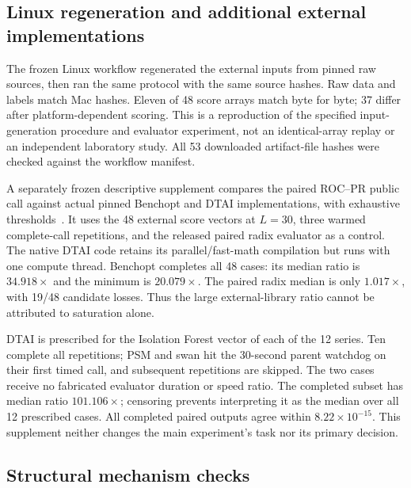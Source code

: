 \subsection{Linux regeneration and additional external implementations}
The frozen Linux workflow regenerated the external inputs from pinned raw
sources, then ran the same protocol with the same source hashes. Raw data
and labels match Mac hashes. Eleven of 48 score arrays match byte for byte;
37 differ after platform-dependent scoring. This is a reproduction of the
specified input-generation procedure and evaluator experiment, not an
identical-array replay or an independent laboratory study. All 53 downloaded
artifact-file hashes were checked against the workflow manifest.

A separately frozen descriptive supplement compares the paired ROC--PR
public call against actual pinned Benchopt and DTAI implementations, with
exhaustive thresholds~\cite{benchopt2026,dtaianomaly}. It uses the 48 external
score vectors at $L=30$, three warmed complete-call repetitions, and the
released paired radix evaluator as a control. The native DTAI code retains
its parallel/fast-math compilation but runs with one compute thread.
Benchopt completes all 48 cases: its median ratio is $34.918\times$ and
the minimum is $20.079\times$. The paired radix median is only $1.017\times$,
with 19/48 candidate losses. Thus the large external-library ratio cannot
be attributed to saturation alone.

DTAI is prescribed for the Isolation Forest vector of each of the 12
series. Ten complete all repetitions; PSM and swan hit the 30-second parent
watchdog on their first timed call, and subsequent repetitions are skipped.
The two cases receive no fabricated evaluator duration or speed ratio.
The completed subset has median ratio $101.106\times$; censoring prevents
interpreting it as the median over all 12 prescribed cases. All completed
paired outputs agree within $8.22\times10^{-15}$. This supplement neither
changes the main experiment's task nor its primary decision.

\subsection{Structural mechanism checks}


